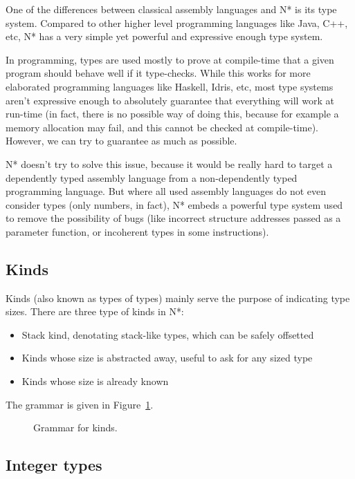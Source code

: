 One of the differences between classical assembly languages and N* is its type system.
Compared to other higher level programming languages like Java, C++, etc, N* has a very simple yet powerful and expressive enough type system.

In programming, types are used mostly to prove at compile-time that a given program should behave well if it type-checks. While this works for more elaborated programming languages like Haskell, Idris, etc, most type systems aren't expressive enough to absolutely guarantee that everything will work at run-time (in fact, there is no possible way of doing this, because for example a memory allocation may fail, and this cannot be checked at compile-time). However, we can try to guarantee as much as possible.

N* doesn't try to solve this issue, because it would be really hard to target a dependently typed assembly language from a non-dependently typed programming language. But where all used assembly languages do not even consider types (only numbers, in fact), N* embeds a powerful type system used to remove the possibility of bugs (like incorrect structure addresses passed as a parameter function, or incoherent types in some instructions).

\subsection{Kinds}\label{subsec:nstar-common-ts-kinds}

Kinds (also known as types of types) mainly serve the purpose of indicating type sizes.
There are three type of kinds in N*:
\begin{itemize}
  \item Stack kind, denotating stack-like types, which can be safely offsetted
  \item Kinds whose size is abstracted away, useful to ask for any sized type
  \item Kinds whose size is already known
\end{itemize}
The grammar is given in Figure~\ref{fig:nstar-common-ts-kinds-syntax}.

\begin{figure}[htb]
  \centering
  \caption{Grammar for kinds.}
  \label{fig:nstar-common-ts-kinds-syntax}
\end{figure}

\subsection{Integer types}\label{subsec:nstar-common-ts-integer}


